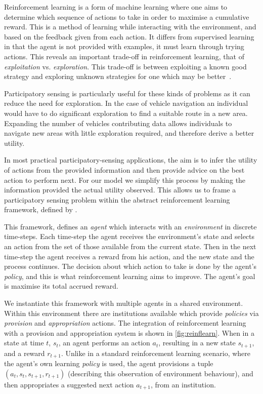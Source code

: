 Reinforcement learning is a form of machine learning where one aims to
determine which sequence of actions to take in order to maximise a cumulative
reward. This is a method of learning while interacting with the environment,
and based on the feedback given from each action. It differs from supervised
learning in that the agent is not provided with examples, it must learn
through trying actions. This reveals an important trade-off in reinforcement
learning, that of \emph{exploitation} vs. \emph{exploration}. This trade-off
is between exploiting a known good strategy and exploring unknown strategies
for one which may be better~\citep{Sutton1998}.

Participatory sensing is particularly useful for these kinds of problems as it
can reduce the need for exploration. In the case of vehicle navigation an
individual would have to do significant exploration to find a suitable route
in a new area. Expanding the number of vehicles contributing data allows
individuals to navigate new areas with little exploration required, and
therefore derive a better utility.

In most practical participatory-sensing applications, the aim is to infer the
utility of actions from the provided information and then provide advice on
the best action to perform next. For our model we simplify this process by
making the information provided the actual utility observed. This allows us
to frame a participatory sensing problem within the abstract reinforcement
learning framework, defined by \citet{Sutton1998}.

This framework, defines an \emph{agent} which interacts with an
\emph{environment} in discrete time-steps. Each time-step the agent receives
the environment's state and selects an action from the set of those available
from the current state. Then in the next time-step the agent receives a reward
from his action, and the new state and the process continues. The decision
about which action to take is done by the agent's \emph{policy}, and this is
what reinforcement learning aims to improve. The agent's goal is maximise its
total accrued reward.

We instantiate this framework with multiple agents in a shared environment.
Within this environment there are institutions available which provide
\emph{policies} via \emph{provision} and \emph{appropriation} actions.  The
integration of reinforcement learning with a provision and appropriation
system is shown in \autoref{fig:reinflearn}. When in a state at time $t$,
$s_t$, an agent performs an action $a_t$, resulting in a new state $s_{t+1}$,
and a reward $r_{t+1}$. Unlike in a standard reinforcement learning scenario,
where the agent's own learning \emph{policy} is used, the agent provisions a
tuple  $(a_t,s_t,s_{t+1},r_{t+1})$ (describing this observation of environment
behaviour), and then appropriates a suggested next action $a_{t+1}$, from an
institution.

